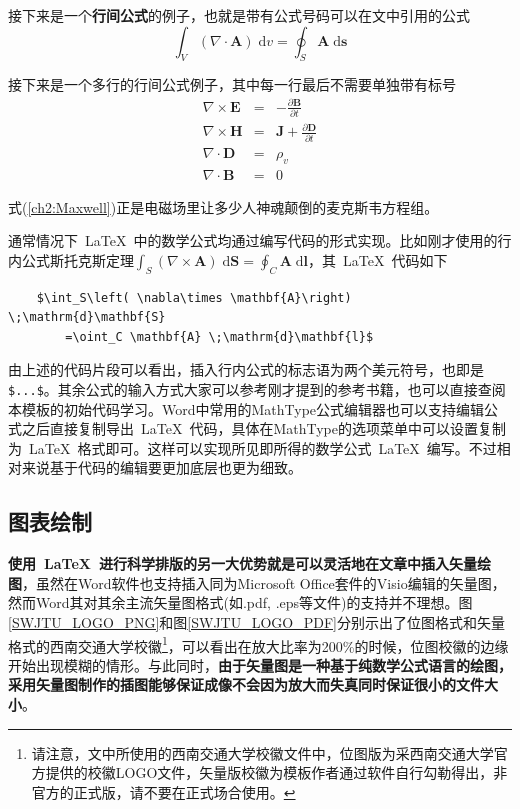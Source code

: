 \par
接下来是一个\textbf{行间公式}的例子，也就是带有公式号码可以在文中引用的公式
\begin{equation}\label{ch2:divTheo}
	\int_V \left( \nabla \cdot \mathbf{A} \right)  \;\mathrm{d}v = \oint_S \mathbf{A} \;\mathrm{d}\mathbf{s}
\end{equation}

\par
接下来是一个多行的行间公式例子，其中每一行最后不需要单独带有标号
\begin{eqnarray}\label{ch2:Maxwell}
\nabla \times \mathbf{E} &=& - \frac{\partial \mathbf{B}}{\partial t} \nonumber \\
\nabla \times \mathbf{H} &=& \mathbf{J} + \frac{\partial \mathbf{D}}{\partial t}  \nonumber \\
\nabla \cdot \mathbf{D} &=& \rho_v \nonumber \\
\nabla \cdot \mathbf{B} &=& 0
\end{eqnarray}

\par
式(\ref{ch2:Maxwell})正是电磁场里让多少人神魂颠倒的麦克斯韦方程组。

\par
通常情况下~\LaTeX{}~中的数学公式均通过编写代码的形式实现。比如刚才使用的行内公式斯托克斯定理$\int_S\left( \nabla\times \mathbf{A}\right)  \;\mathrm{d}\mathbf{S}=\oint_C \mathbf{A} \;\mathrm{d}\mathbf{l}$，其~\LaTeX{}~代码如下

\begin{framed}
	\begin{verbatim}
	$\int_S\left( \nabla\times \mathbf{A}\right)  \;\mathrm{d}\mathbf{S}
		=\oint_C \mathbf{A} \;\mathrm{d}\mathbf{l}$
	\end{verbatim}
\end{framed}


由上述的代码片段可以看出，插入行内公式的标志语为两个美元符号，也即是\verb|$...$|。其余公式的输入方式大家可以参考刚才提到的参考书籍，也可以直接查阅本模板的初始代码学习。Word中常用的MathType公式编辑器也可以支持编辑公式之后直接复制导出~\LaTeX{}~代码，具体在MathType的选项菜单中可以设置复制为~\LaTeX{}~格式即可。这样可以实现所见即所得的数学公式~\LaTeX{}~编写。不过相对来说基于代码的编辑要更加底层也更为细致。

\subsection{图表绘制}
\textbf{使用~\LaTeX{}~进行科学排版的另一大优势就是可以灵活地在文章中插入矢量绘图}，虽然在Word软件也支持插入同为Microsoft Office套件的Visio编辑的矢量图，然而Word其对其余主流矢量图格式(如.pdf, .eps等文件)的支持并不理想。图\ref{SWJTU_LOGO_PNG}和图\ref{SWJTU_LOGO_PDF}分别示出了位图格式和矢量格式的西南交通大学校徽\footnote{请注意，文中所使用的西南交通大学校徽文件中，位图版为采西南交通大学官方提供的校徽LOGO文件，矢量版校徽为模板作者通过软件自行勾勒得出，非官方的正式版，请不要在正式场合使用。}，可以看出在放大比率为200\%的时候，位图校徽的边缘开始出现模糊的情形。与此同时，\textbf{由于矢量图是一种基于纯数学公式语言的绘图，采用矢量图制作的插图能够保证成像不会因为放大而失真同时保证很小的文件大小}。

